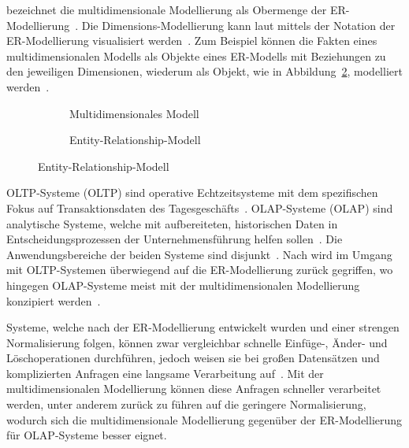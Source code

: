 \documentclass[
  language=german, %
  type=bachelor%
]{isthesis}
\begin{document}
\begin{content}
  \textsc{\citeauthor{ballard1998data}} bezeichnet die multidimensionale Modellierung
  als Obermenge der ER-Modellierung~\cite[][S. 47]{ballard1998data}. Die
  Dimensions-Modellierung kann laut \textsc{\citeauthor{ballard1998data}}
  mittels der Notation der ER-Modellierung visualisiert werden~\cite[][S.
  47]{ballard1998data}. Zum Beispiel können die Fakten eines multidimensionalen Modells
  als Objekte eines ER-Modells mit Beziehungen zu den jeweiligen Dimensionen,
  wiederum als Objekt, wie in Abbildung~\ref{vergleich-erm}, modelliert
  werden~\cite[][S. 48]{ballard1998data}. 

  \begin{figure}[caption={Vergleich multidimensionale Modellierung und ERM}, label={}]
    \centering
    \begin{subfigure}{.49\textwidth}
      \centering
      \resizebox{\linewidth}{!}{}
      \caption{Multidimensionales Modell}
    \end{subfigure}
    \begin{subfigure}{.49\textwidth}
      \centering
      \resizebox{\linewidth}{!}{}
      \caption{Entity-Relationship-Modell}\label{vergleich-erm}
    \end{subfigure}
  \end{figure}

  \acrlong{OLTP}-Systeme (\acrshort{OLTP}) sind operative Echtzeitsysteme mit dem
  spezifischen Fokus auf Transaktionsdaten des Tagesgeschäfts~\cite[][S.
  11]{gabriel2009data}. \acrlong{OLAP}-Systeme (\acrshort{OLAP}) sind analytische Systeme,
  welche mit aufbereiteten, historischen Daten in Entscheidungsprozessen der
  Unternehmensführung helfen sollen~\cite[][S. 1]{chaudhuri1997overview}. Die
  Anwendungsbereiche der beiden Systeme sind disjunkt~\cite[][S.
  334]{chamoni2000line}. Nach \textsc{\citeauthor{phipps2002automating}} wird
  im Umgang mit \acrshort{OLTP}-Systemen überwiegend auf die ER-Modellierung
  zurück gegriffen, wo hingegen \acrshort{OLAP}-Systeme meist mit der
  multidimensionalen Modellierung konzipiert werden~\cite[][S.
  2]{phipps2002automating}. 

  Systeme, welche nach der ER-Modellierung entwickelt wurden und einer strengen
  Normalisierung folgen, können zwar vergleichbar schnelle Einfüge-, Änder- und
  Löschoperationen durchführen, jedoch weisen sie bei großen Datensätzen und
  komplizierten Anfragen eine langsame Verarbeitung auf~\cite[][S.
  52]{ballard2012dimensional}. Mit der multidimensionalen Modellierung können diese
  Anfragen schneller verarbeitet werden\cite[][S.  52]{ballard2012dimensional},
  unter anderem zurück zu führen auf die geringere Normalisierung, wodurch
  sich die multidimensionale Modellierung gegenüber der ER-Modellierung für
  \acrshort{OLAP}-Systeme besser eignet.



\end{content}
\end{document}
